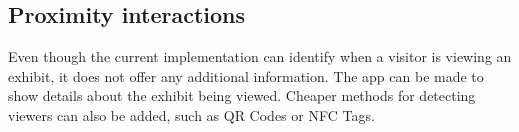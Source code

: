 \subsection{Proximity interactions}
Even though the current implementation can identify when a visitor is viewing an exhibit, it does not offer any additional information. The app can be made to show details about the exhibit being viewed. Cheaper methods for detecting viewers can also be added, such as QR Codes or NFC Tags. 

